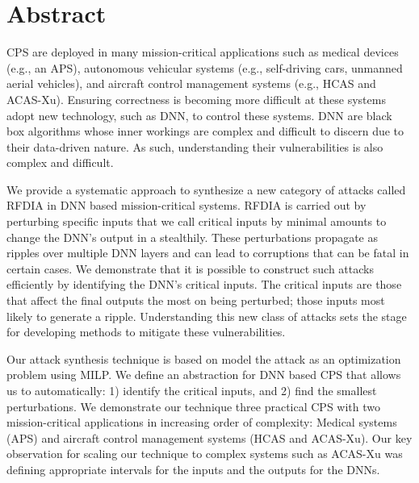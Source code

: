 
\chapter{Abstract}

\ac{CPS} are deployed in many mission-critical applications such as medical devices (e.g., an \ac{APS}), autonomous vehicular systems (e.g., self-driving cars, unmanned aerial vehicles), and aircraft control management systems (e.g.,  \ac{HCAS} and \ac{ACAS-Xu}). 
Ensuring correctness is becoming more difficult at these systems adopt new technology, such as \ac{DNN}, to control these systems. 
\ac{DNN} are black box algorithms whose inner workings are complex and difficult to discern due to their data-driven nature.
As such, understanding their vulnerabilities is also complex and difficult. 


We provide a systematic approach to synthesize a new category of attacks called \ac{RFDIA} in \ac{DNN} based mission-critical systems.
\ac{RFDIA} is carried out by perturbing specific inputs that we call critical inputs by minimal amounts to  change the \ac{DNN}'s output in a stealthily. These  perturbations propagate as ripples over multiple \ac{DNN} layers and can lead to corruptions that  can be fatal in certain cases. 
We demonstrate that it is possible  to construct such attacks efficiently by identifying the \ac{DNN}'s critical inputs. 
The critical inputs are those that  affect the final outputs the most on being perturbed; those inputs most likely to generate a ripple. 
Understanding this new class of attacks sets the stage for developing methods to mitigate these vulnerabilities. 

Our attack synthesis technique is based on model the attack as an optimization problem using \ac{MILP}.
We define an abstraction for \ac{DNN} based \ac{CPS} that allows us to automatically: 1) identify the critical inputs, and 2) find the smallest perturbations. 
We demonstrate our technique three practical \ac{CPS} with two mission-critical applications in increasing order of complexity: Medical systems (\ac{APS}) and aircraft control management systems (\ac{HCAS} and \ac{ACAS-Xu}). 
Our key observation for scaling our technique to complex systems such as \ac{ACAS-Xu} was defining appropriate intervals for the inputs and the outputs for the \ac{DNN}s.



